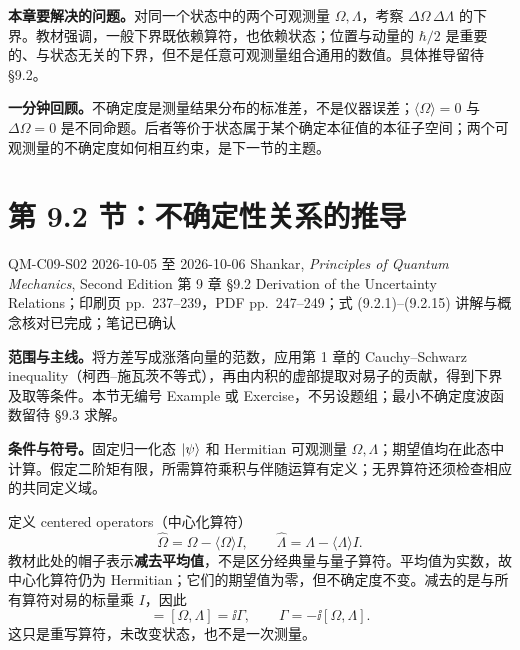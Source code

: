 \textbf{本章要解决的问题。}对同一个状态中的两个可观测量 $\Omega,\Lambda$，考察 $\Delta\Omega\,\Delta\Lambda$ 的下界。教材强调，一般下界既依赖算符，也依赖状态；位置与动量的 $\hbar/2$ 是重要的、与状态无关的下界，但不是任意可观测量组合通用的数值。具体推导留待 \S 9.2。

\textbf{一分钟回顾。}不确定度是测量结果分布的标准差，不是仪器误差；$\langle\Omega\rangle=0$ 与 $\Delta\Omega=0$ 是不同命题。后者等价于状态属于某个确定本征值的本征子空间；两个可观测量的不确定度如何相互约束，是下一节的主题。

\section{第 9.2 节：不确定性关系的推导}
\label{section:QM-C09-S02}
\studymeta
  {QM-C09-S02}
  {2026-10-05 至 2026-10-06}
  {Shankar, \textit{Principles of Quantum Mechanics}, Second Edition}
  {第 9 章 \S 9.2 Derivation of the Uncertainty Relations；印刷页 pp.~237--239，PDF pp.~247--249；式 (9.2.1)--(9.2.15)}
  {讲解与概念核对已完成；笔记已确认}

\textbf{范围与主线。}将方差写成涨落向量的范数，应用第 1 章的 Cauchy--Schwarz inequality（柯西--施瓦茨不等式），再由内积的虚部提取对易子的贡献，得到下界及取等条件。本节无编号 Example 或 Exercise，不另设题组；最小不确定度波函数留待 \S 9.3 求解。

\textbf{条件与符号。}固定归一化态 $\left|\psi\right\rangle$ 和 Hermitian 可观测量 $\Omega,\Lambda$；期望值均在此态中计算。假定二阶矩有限，所需算符乘积与伴随运算有定义；无界算符还须检查相应的共同定义域。

定义 centered operators（中心化算符）
\begin{equation}
  \widehat\Omega=\Omega-\langle\Omega\rangle I,
  \qquad
  \widehat\Lambda=\Lambda-\langle\Lambda\rangle I.
  \label{eq:QM-C09-S02-centered}
\end{equation}
教材此处的帽子表示\textbf{减去平均值}，不是区分经典量与量子算符。平均值为实数，故中心化算符仍为 Hermitian；它们的期望值为零，但不确定度不变。减去的是与所有算符对易的标量乘 $I$，因此
\begin{equation}
  [\widehat\Omega,\widehat\Lambda]
  =[\Omega,\Lambda]
  =\ii\Gamma,\qquad \Gamma=-\ii[\Omega,\Lambda].
  \label{eq:QM-C09-S02-commutator}
\end{equation}
这只是重写算符，未改变状态，也不是一次测量。


